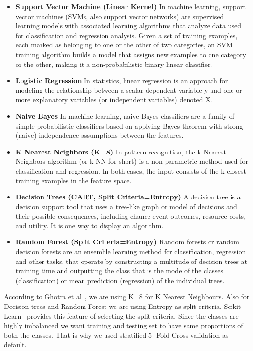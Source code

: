 \documentclass[conference]{IEEEtran}
\begin{document}
\begin{itemize}
 \item \textbf{Support Vector Machine (Linear Kernel)}
 In machine learning, support vector machines (SVMs, also support vector networks) are supervised learning models with associated learning algorithms that analyze data used for classification and regression analysis. Given a set of training examples, each marked as belonging to one or the other of two categories, an SVM training algorithm builds a model that assigns new examples to one category or the other, making it a non-probabilistic binary linear classifier.
 \item \textbf{Logistic Regression}
 In statistics, linear regression is an approach for modeling the relationship between a scalar dependent variable y and one or more explanatory variables (or independent variables) denoted X.
 \item \textbf{Naive Bayes}
 In machine learning, naive Bayes classifiers are a family of simple probabilistic classifiers based on applying Bayes theorem with strong (naive) independence assumptions between the features.
 \item \textbf{K Nearest Neighbors (K=8)}
 In pattern recognition, the k-Nearest Neighbors algorithm (or k-NN for short) is a non-parametric method used for classification and regression. In both cases, the input consists of the k closest training examples in the feature space.
 \item \textbf{Decision Trees (CART, Split Criteria=Entropy)}
 A decision tree is a decision support tool that uses a tree-like graph or model of decisions and their possible consequences, including chance event outcomes, resource costs, and utility. It is one way to display an algorithm.
 \item \textbf{Random Forest (Split Criteria=Entropy)}
 Random forests or random decision forests are an ensemble learning method for classification, regression and other tasks, that operate by constructing a multitude of decision trees at training time and outputting the class that is the mode of the classes (classification) or mean prediction (regression) of the individual trees. 
\end{itemize}

According to Ghotra et al~\cite{ghotra2015revisiting}, we are using K=8 for K Nearest Neighbours. Also for Decision trees and Random Forest we are using Entropy as split criteria. Scikit-Learn~\cite{pedregosa2011scikit} provides this feature of selecting the split criteria. Since the classes are highly imbalanced we want training and testing set to have same proportions of both the classes. That is why we used stratified 5- Fold Cross-validation as default.
\end{document}
